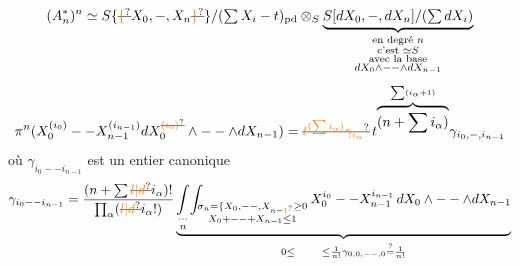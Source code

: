 \[
 (A_n^*)^n\simeq S\{\deleted{\unsure{\{}}X_0,-,X_n\deleted{\unsure{\}}}\}/(\textstyle\sum X_i-t)_{\mathrm{pd}}\otimes_S
 \underbrace{S[dX_0,-,dX_n]/(\textstyle\sum dX_i)}_{
 \substack{\text{en degré }n\\\text{c'est }\simeq S\\\text{avec la base}\\dX_0\wedge--\wedge dX_{n-1}}}
\]
\[
 \pi^n(X_0^{(i_0)}--X_{n-1}^{(i_{n-1})}dX_0^{\deleted{\unsure{(i_0)}}}\wedge--\wedge dX_{n-1})
 =\deleted{\unsure{t^{(\sum i_\alpha)}\gamma_{i_\alpha}}}\,t^{\overbrace{(n+\sum i_\alpha)}^{\sum(i_\alpha+1)}}\gamma_{i_0,-,i_{n-1}}
\]
où $\gamma_{i_0--i_{n-1}}$ est un entier canonique
\[
 \gamma_{i_0--i_{n-1}}=\frac{(n+\sum\deleted{\unsure{l|d}}i_\alpha)!}{\prod_\alpha(\deleted{\unsure{l|d}}i_\alpha!)}
 \underbrace{\underset{\substack{\cdots\\ n}}{\int}\!\int_{\substack{\sigma_n=\{X_0,--,X_{n-\unsure{1}}\geq0\\X_0+--+X_{n-1}\leq1}}
 X_0^{i_0}--X_{n-1}^{i_{n-1}}\,dX_0\wedge--\wedge dX_{n-1}}_{0\leq\qquad\leq\frac1{n!}\gamma_{0,0,--,0}\mathrel{\overset{?}{=}}\frac1{n!}}
\]

